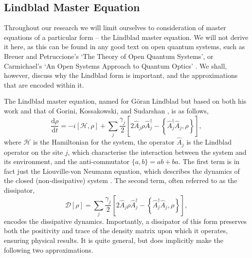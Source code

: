 \subsection{\label{sec:lindblad}Lindblad Master Equation}
Throughout our research we will limit ourselves to consideration of master equations of a particular form -- the Lindblad master equation. We will not derive it here, as this can be found in any good text on open quantum systems, such as Breuer and Petruccione's `The Theory of Open Quantum Systems', or Carmichael's `An Open Systems Approach to Quantum Optics' \cite{BP_TMQME,Carmichael_OSAQO}. We shall, however, discuss why the Lindblad form is important, and the approximations that are encoded within it. 

The Lindblad master equation, named for G\"{o}ran Lindblad but based on both his work and that of Gorini, Kossakowski, and Sudarshan \cite{Lindblad1976,Gorini1976}, is as follows,
\begin{equation}
	\frac{\mathrm{d}\rho}{\mathrm{d}t} = -i [\mathcal{H}, \rho] + \sum_{j} \frac{\gamma_{j}}{2} \left[ 2\hat{A}_{j} \rho \hat{A}_{j}^{\dagger} - \left\{\hat{A}_{j}^{\dagger}\hat{A}_{j}, \rho\right\}\right],
	\label{eq:oqs3-1}
\end{equation}
where \(\mathcal{H}\) is the Hamiltonian for the system, the operator \(\hat{A}_{j}\) is the Lindblad operator on the site \(j\), which characterise the interaction between the system and its environment, and the anti-commutator \(\{a, b\} = ab + ba\). The first term is in fact just the Liouville-von Neumann equation, which describes the dynamics of the closed (non-dissipative) system \cite{BP_LvN}. The second term, often referred to as the dissipator,
\begin{equation}
	\mathcal{D}[\rho] = \sum_{j}\frac{\gamma_{j}}{2}\left[2\hat{A}_{j}\rho\hat{A}_{j}^{\dagger} - \left\{\hat{A}_{j}^{\dagger}\hat{A}_{j}, \rho\right\}\right],
	\label{eq:oqs3-2}
\end{equation}
encodes the dissipative dynamics. Importantly, a dissipator of this form preserves both the positivity and trace of the density matrix upon which it operates, ensuring physical results. It is quite general, but does implicitly make the following two approximations.


